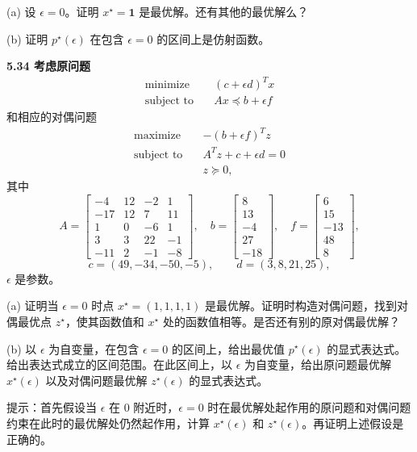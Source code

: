 \documentclass[UTF8,12pt,a4paper,fontset=fandol]{ctexart}
\begin{document}
(a) 设 $\epsilon=0$。证明 $x^\star=\mathbf{1}$ 是最优解。还有其他的最优解么？

(b) 证明 $p^\star(\epsilon)$ 在包含 $\epsilon=0$ 的区间上是仿射函数。

\noindent\textbf{5.34 考虑原问题}
\[
\begin{aligned}
\text{minimize}\quad & (c+\epsilon d)^Tx\\
\text{subject to}\quad & Ax\preceq b+\epsilon f
\end{aligned}
\]
和相应的对偶问题
\[
\begin{aligned}
\text{maximize}\quad & -(b+\epsilon f)^Tz\\
\text{subject to}\quad & A^Tz+c+\epsilon d=0\\
& z\succeq 0,
\end{aligned}
\]
其中
\[
A=
\begin{bmatrix}
-4 & 12 & -2 & 1\\
-17 & 12 & 7 & 11\\
1 & 0 & -6 & 1\\
3 & 3 & 22 & -1\\
-11 & 2 & -1 & -8
\end{bmatrix},\quad
b=
\begin{bmatrix}
8\\
13\\
-4\\
27\\
-18
\end{bmatrix},\quad
f=
\begin{bmatrix}
6\\
15\\
-13\\
48\\
8
\end{bmatrix},
\]
\[
c=(49,-34,-50,-5),\qquad d=(3,8,21,25),
\]
$\epsilon$ 是参数。

(a) 证明当 $\epsilon=0$ 时点 $x^\star=(1,1,1,1)$ 是最优解。证明时构造对偶问题，找到对偶最优点 $z^\star$，使其函数值和 $x^\star$ 处的函数值相等。是否还有别的原对偶最优解？

(b) 以 $\epsilon$ 为自变量，在包含 $\epsilon=0$ 的区间上，给出最优值 $p^\star(\epsilon)$ 的显式表达式。给出表达式成立的区间范围。在此区间上，以 $\epsilon$ 为自变量，给出原问题最优解 $x^\star(\epsilon)$ 以及对偶问题最优解 $z^\star(\epsilon)$ 的显式表达式。

提示：首先假设当 $\epsilon$ 在 0 附近时，$\epsilon=0$ 时在最优解处起作用的原问题和对偶问题约束在此时的最优解处仍然起作用，计算 $x^\star(\epsilon)$ 和 $z^\star(\epsilon)$。再证明上述假设是正确的。
\end{document}
